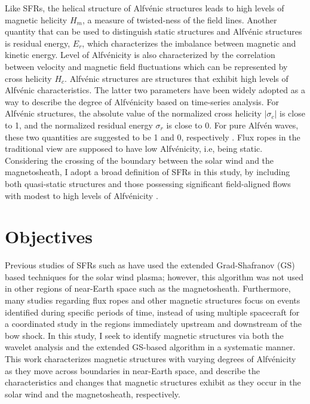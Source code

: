 Like SFRs, the helical structure of Alfv\'enic structures leads to high levels of magnetic helicity $H_m$\footnotemark{}, a measure of twisted-ness of the field lines. Another quantity that can be used to distinguish static structures and Alfv\'enic structures is residual energy, $E_r$\footnotemark[\value{footnote}], which characterizes the imbalance between magnetic and kinetic energy. Level of Alfv\'enicity is also characterized by the correlation between velocity and magnetic field fluctuations which can be represented by cross helicity $H_c$\footnotemark[\value{footnote}]. Alfv\'enic structures are structures that exhibit high levels of Alfv\'enic characteristics. The latter two parameters have been widely adopted as a way to describe the degree of Alfv\'enicity based on time-series analysis. For Alfv\'enic structures, the absolute value of the normalized cross helicity $|\sigma_c|$ is close to 1, and the normalized residual energy $\sigma_r$ is close to 0. For pure Alfv\'en waves, these two quantities are suggested to be 1 and 0, respectively \citep{Bruno:2013}. Flux ropes in the traditional view are supposed to have low Alfv\'enicity, i.e, being static. Considering the crossing of the boundary between the solar wind and the magnetosheath, I adopt a broad definition of SFRs in this study, by including both quasi-static structures and those possessing significant field-aligned flows with modest to high levels of Alfv\'enicity \citep{Chen:2022}.



\section{Objectives}
Previous studies of SFRs such as \cite{Chen:2022} have used the extended Grad-Shafranov (GS) based techniques for the solar wind plasma; however, this algorithm was not used in other regions of near-Earth space such as the magnetosheath. Furthermore, many studies regarding flux ropes and other magnetic structures \citep{Zhao:2020, Chen:2021} focus on events identified during specific periods of time, instead of using multiple spacecraft for a coordinated study in the regions immediately upstream and downstream of the bow shock. In this study, I seek to identify magnetic structures via both the wavelet analysis and the extended GS-based algorithm in a systematic manner. This work characterizes magnetic structures with varying degrees of Alfv\'enicity as they move across boundaries in near-Earth space, and describe the characteristics and changes that magnetic structures exhibit as they occur in the solar wind and the magnetosheath, respectively.  

